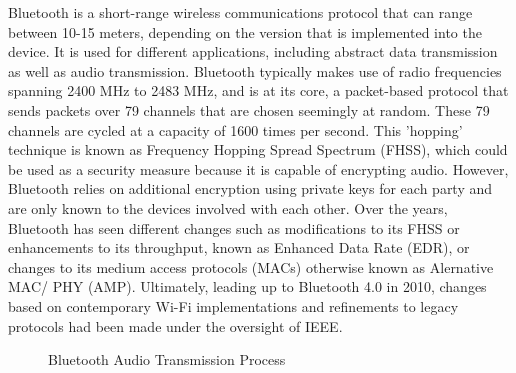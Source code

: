 \documentclass[conference]{IEEEtran}
\begin{document}
Bluetooth is a short-range wireless communications protocol that can range between 10-15
meters, depending on the version that is implemented into the device. It is used for
different applications, including abstract data transmission as well as audio transmission.
Bluetooth typically makes use of radio frequencies spanning 2400 MHz to 2483 MHz, and is at
its core, a packet-based protocol that sends packets over 79 channels that are chosen
seemingly at random. These 79 channels are cycled at a capacity of 1600 times per second.
This 'hopping' technique is known as Frequency Hopping Spread Spectrum (FHSS), which could be
used as a security measure because it is capable of encrypting audio. However, Bluetooth
relies on additional encryption using private keys for each party and are only known to the
devices involved with each other. Over the years, Bluetooth has seen different changes such
as modifications to its FHSS or enhancements to its throughput, known as Enhanced Data Rate
(EDR), or changes to its medium access protocols (MACs) otherwise known as Alernative MAC/
PHY (AMP). Ultimately, leading up to Bluetooth 4.0 in 2010, changes based on contemporary
Wi-Fi implementations and refinements to legacy protocols had been made under the oversight
of IEEE.\cite{noauthor_bluetooth_nodate}

\begin{figure}
    \centering
    \caption{Bluetooth Audio Transmission Process}
    \label{fig:bluetooth_process}
\end{figure}
\end{document}
